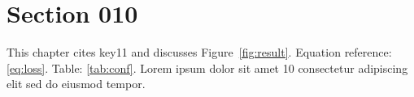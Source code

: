 \section{Section 010}\label{sec:s10}
This chapter cites key11 and discusses Figure~\ref{fig:result}.
Equation reference: \eqref{eq:loss}. Table: \ref{tab:conf}.
Lorem ipsum dolor sit amet 10 consectetur adipiscing elit sed do eiusmod tempor.
